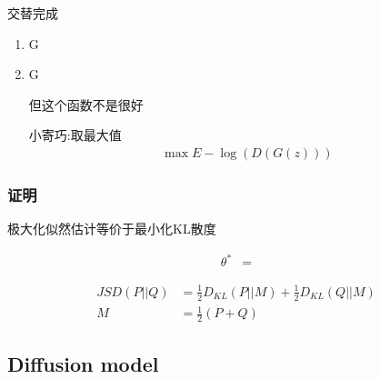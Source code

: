 交替完成
\begin{enumerate}
    \item G
    \item G
    
    \subitem 但这个函数不是很好

    \subitem 小寄巧:取最大值
    \begin{align*}
        \max E -\log(D(G(z)))
    \end{align*}
\end{enumerate}

\subsubsection{证明}

极大化似然估计等价于最小化KL散度

\begin{align*}
    \theta^*&=
\end{align*}


\begin{align*}
    JSD(P||Q)&=\frac{1}{2}D_{KL}(P||M)+\frac{1}{2}D_{KL}(Q||M)\\
    M&=\frac{1}{2}(P+Q)
\end{align*}


\subsection{Diffusion model}